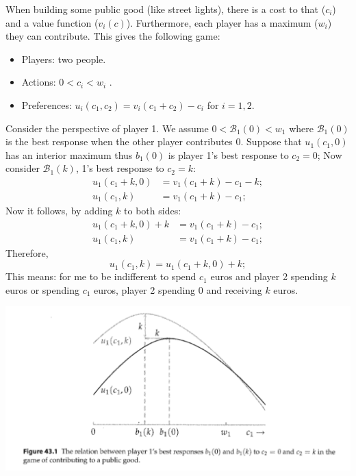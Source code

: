 \begin{illustration}
      When building some public good (like street lights), there is a cost to that ($c_i$) and a value function ($v_i(c)$). Furthermore, each player has a maximum ($w_i$) they can contribute. This gives the following game:
      \begin{itemize}
            \item Players: two people.
            \item Actions: $0 < c_i < w_i$ .
            \item Preferences: $u_i (c_1 , c_2 ) = v_i (c_1 +c_2 ) - c_i$ for $i=1,2$.
      \end{itemize}

      Consider the perspective of player 1. 
      We assume $0 < \mathcal{B}_1(0) < w_1$ where $\mathcal{B}_1(0)$ is the best response when the other player contributes $0$.   
      Suppose that $u_1 (c_1 ,0)$ has an interior maximum thus $b_1(0)$ is player 1's best response to $c_ 2 = 0$;
      Now consider $\mathcal{B}_1(k)$, 1's best response to $c_2 = k$:
      \begin{align*}
            u_1(c_1 +k,0) & = v_1 (c_1 +k) - c_1 - k; \\
            u_1(c_1 ,k)   & = v_1 (c_1 +k) - c_1 ;
      \end{align*}
      Now it follows, by adding $k$ to both sides:
      \begin{align*}
            u_1(c_1 +k,0) + k & = v_1 (c_1 +k) - c_1 ; \\
            u_1(c_1 ,k)       & = v_1 (c_1 +k) - c_1 ;
      \end{align*}
      Therefore,
      \[
            u_1(c_1 ,k) =u_1(c_1 +k,0) + k;
      \]
      This means: for me to be indifferent to spend $c_1$ euros and player 2 spending $k$ euros or spending $c_1$ euros, player 2 spending $0$ and receiving $k$ euros.

      \includegraphics[width=1\textwidth]{im1.png}


\end{illustration}
